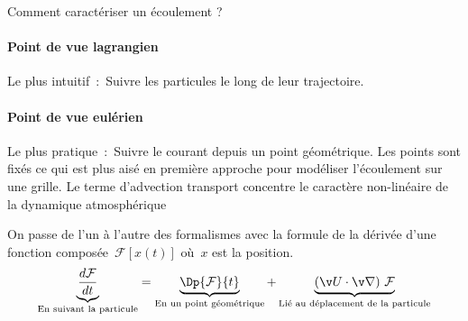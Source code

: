 \sk
Comment caractériser un écoulement ?

\sk
\paragraph{Point de vue lagrangien} Le plus intuitif~:~Suivre les particules le long de leur trajectoire.
\paragraph{Point de vue eulérien} Le plus pratique~:~Suivre le courant depuis un point géométrique. Les points sont fixés ce qui est plus aisé en première approche pour modéliser l'écoulement sur une grille.
Le terme d'advection transport concentre le caractère non-linéaire de la dynamique atmosphérique

\sk
On passe de l'un à l'autre des formalismes avec la formule de la dérivée d'une fonction composée~$\mathcal{F}[x(t)]$ où~$x$ est la position.
\[
\underbrace{\derd{\mathcal{F}}{t}}_{\text{En suivant la particule}}
= 
\underbrace{\Dp{\mathcal{F}}{t}}_{\text{En un point géométrique}} 
+ 
\underbrace{\left(\v U \cdot \v \nabla \right)\,\mathcal{F} }_{\text{Lié au déplacement de la particule}}
\]


